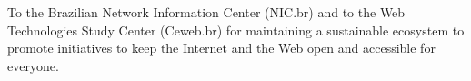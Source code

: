 \documentclass[sigconf]{acmart}
\begin{document}
%
\begin{acks}
To the Brazilian Network Information Center (NIC.br) and to the Web Technologies Study Center (Ceweb.br) for maintaining a sustainable ecosystem to promote initiatives to keep the Internet and the Web open and accessible for everyone.
\end{acks}

%


\end{document}
